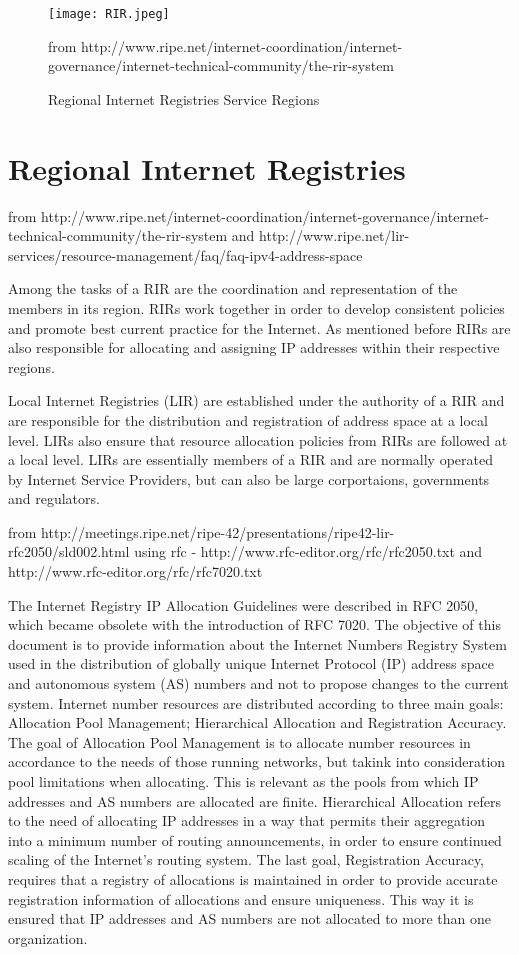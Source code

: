 \documentclass[11pt,a4paper]{scrreprt}
\begin{document}
\begin{figure}[h!]
\centering
\texttt{[image: RIR.jpeg]}
\caption{Regional Internet Registries Service Regions}
from http://www.ripe.net/internet-coordination/internet-governance/internet-technical-community/the-rir-system
\label{fig:rirs_image}
\end{figure}

\section{Regional Internet Registries}
from http://www.ripe.net/internet-coordination/internet-governance/internet-technical-community/the-rir-system and http://www.ripe.net/lir-services/resource-management/faq/faq-ipv4-address-space


Among the tasks of a RIR are the coordination and representation of the members in its region. RIRs work together in order to develop consistent policies and promote best current practice for the Internet. As mentioned before RIRs are also responsible for allocating and assigning IP addresses within their respective regions. 

Local Internet Registries (LIR) are  established under the authority of a RIR and are responsible for the distribution and registration of address space at a local level. LIRs also ensure that resource allocation policies from RIRs are followed at a local level. LIRs are essentially members of a RIR and are normally operated by Internet Service Providers, but can also be large corportaions, governments and regulators.

from http://meetings.ripe.net/ripe-42/presentations/ripe42-lir-rfc2050/sld002.html using rfc - http://www.rfc-editor.org/rfc/rfc2050.txt and http://www.rfc-editor.org/rfc/rfc7020.txt

The Internet Registry IP Allocation Guidelines were described in RFC 2050, which became obsolete with the introduction of RFC 7020. The objective of this document is to provide information about the Internet Numbers Registry System used in the distribution of globally unique Internet Protocol (IP) address space and autonomous system (AS) numbers and not to propose changes to the current system. Internet number resources are distributed according to three main goals: Allocation Pool Management; Hierarchical Allocation and Registration Accuracy. The goal of Allocation Pool Management is to allocate number resources in accordance to the needs of those running networks, but takink into consideration pool limitations when allocating. This is relevant as the pools from which IP addresses and AS numbers are allocated are finite. Hierarchical Allocation refers to the need of allocating IP addresses in a way that permits their aggregation into a minimum number of routing announcements, in order to ensure continued scaling of the Internet's routing system. The last goal, Registration Accuracy,  requires that a registry of allocations is maintained in order to provide accurate registration information of allocations and ensure uniqueness. This way it is ensured that IP addresses and AS numbers are not allocated to more than one organization.  
\end{document}
